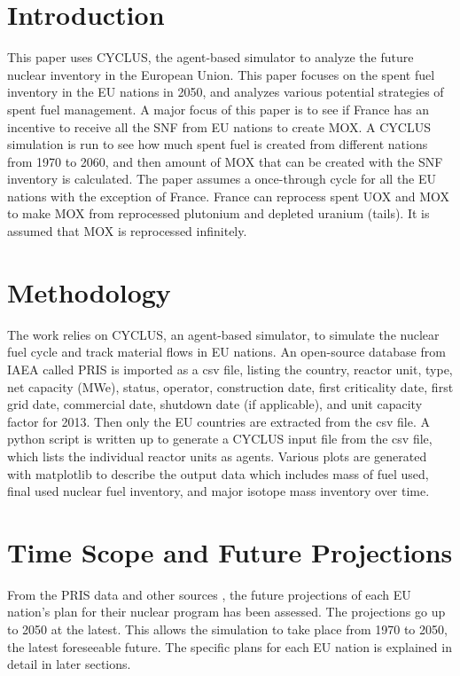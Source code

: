 \section{Introduction}
This paper uses CYCLUS, the agent-based simulator \cite{huff_fundamental_2016} to analyze
the future nuclear inventory in the European Union. This paper focuses on the spent fuel
inventory in the EU nations in 2050, and analyzes various potential strategies of spent fuel
management.
A major focus of this paper is to see if France has an incentive
to receive all the \gls{SNF} from EU nations to create \gls{MOX}.
A CYCLUS simulation is run to see
how much spent fuel is created from different nations from 1970 to 2060, and then amount
of \gls{MOX} that can be created with the \gls{SNF} inventory is calculated.
The paper assumes a once-through cycle for all the 
EU nations with the exception of France. France can reprocess spent \gls{UOX} and \gls{MOX} to
make \gls{MOX} from reprocessed plutonium and depleted uranium (tails). It is assumed that
\gls{MOX} is reprocessed infinitely. 


\section{Methodology}
The work relies on CYCLUS, an agent-based simulator, to simulate the nuclear fuel cycle
and track material flows in EU nations. An open-source database from \gls{IAEA} called
\gls{PRIS} is imported as a csv file, listing the country, reactor unit, type, net capacity (MWe), status,
operator, construction date, first criticality date, first grid date, commercial date, shutdown
date (if applicable), and unit capacity factor for 2013. Then only the EU countries are extracted
from the csv file. A python script is written up to generate a CYCLUS input file from the csv file,
which lists the individual reactor units as agents. Various plots are 
generated with matplotlib to describe the output data which includes mass of fuel used, final used nuclear fuel
inventory, and major isotope mass inventory over time.


\section{Time Scope and Future Projections}
From the \gls{PRIS} data and other sources \cite{world_nuclear_2017} \cite{joskow_future_2012} \cite{hatch_politics_2013},
the future projections of each EU nation's plan for their nuclear program has been assessed.
The projections go up to 2050 at the latest. This allows the simulation to take place from
1970 to 2050, the latest foreseeable future. The specific plans for each EU nation is explained
in detail in later sections.


